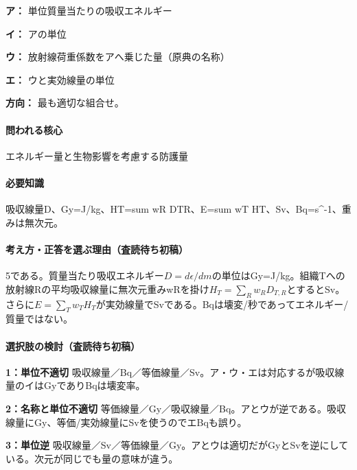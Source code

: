 \noindent\textbf{ア：} 単位質量当たりの吸収エネルギー\par

\noindent\textbf{イ：} アの単位\par

\noindent\textbf{ウ：} 放射線荷重係数をアへ乗じた量（原典の名称）\par

\noindent\textbf{エ：} ウと実効線量の単位\par

\noindent\textbf{方向：} 最も適切な組合せ。\par

\paragraph{問われる核心} エネルギー量と生物影響を考慮する防護量

\paragraph{必要知識} 吸収線量D、Gy=\allowbreak{}J/kg、HT=\allowbreak{}sum wR DTR、E=\allowbreak{}sum wT HT、Sv、Bq=\allowbreak{}s\textasciicircum{}-1、重みは無次元。

\paragraph{考え方・正答を選ぶ理由（査読待ち初稿）} 5である。質量当たり吸収エネルギー\(D=d\epsilon/dm\)の単位はGy=\allowbreak{}J/kg。組織Tへの放射線Rの平均吸収線量に無次元重みwRを掛け\(H_T=\sum_Rw_RD_{T,R}\)とするとSv。さらに\(E=\sum_Tw_TH_T\)が実効線量でSvである。Bqは壊変/秒であってエネルギー/質量ではない。

\paragraph{選択肢の検討（査読待ち初稿）}\mbox{}\par

\noindent\textbf{1：単位不適切} 吸収線量／Bq／等価線量／Sv。ア・ウ・エは対応するが吸収線量のイはGyでありBqは壊変率。\par

\noindent\textbf{2：名称と単位不適切} 等価線量／Gy／吸収線量／Bq。アとウが逆である。吸収線量にGy、等価/実効線量にSvを使うのでエBqも誤り。\par

\noindent\textbf{3：単位逆} 吸収線量／Sv／等価線量／Gy。アとウは適切だがGyとSvを逆にしている。次元が同じでも量の意味が違う。\par

